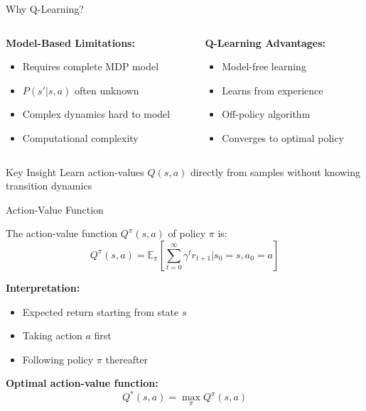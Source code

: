 \documentclass[aspectratio=169,10pt]{beamer}
\begin{document}
\begin{frame}{Why Q-Learning?}
\begin{columns}[T]
\begin{column}{0.5\textwidth}
\textbf{Model-Based Limitations:}
\begin{itemize}
    \item Requires complete MDP model
    \item $P(s'|s,a)$ often unknown
    \item Complex dynamics hard to model
    \item Computational complexity
\end{itemize}
\end{column}
\begin{column}{0.5\textwidth}
\textbf{Q-Learning Advantages:}
\begin{itemize}
    \item Model-free learning
    \item Learns from experience
    \item Off-policy algorithm
    \item Converges to optimal policy
\end{itemize}
\end{column}
\end{columns}

\vspace{1em}
\begin{block}{Key Insight}
Learn action-values $Q(s,a)$ directly from samples without knowing transition dynamics
\end{block}
\end{frame}

\begin{frame}{Action-Value Function}
\begin{definition}
The action-value function $Q^\pi(s,a)$ of policy $\pi$ is:
$$Q^\pi(s,a) = \mathbb{E}_\pi\left[\sum_{t=0}^{\infty}\gamma^t r_{t+1} \bigg| s_0=s, a_0=a\right]$$
\end{definition}

\textbf{Interpretation:}
\begin{itemize}
    \item Expected return starting from state $s$
    \item Taking action $a$ first
    \item Following policy $\pi$ thereafter
\end{itemize}

\textbf{Optimal action-value function:}
$$Q^*(s,a) = \max_\pi Q^\pi(s,a)$$
\end{frame}
\end{document}
